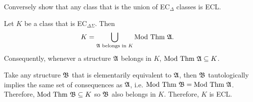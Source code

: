 \begin{problem}[26]
\begin{enumalph}
    \item Conversely show that any class that is the union of EC$_\Delta$ classes
      is ECL.
      \begin{Answer}
        Let $K$ be a class that is EC$_{\Delta \Sigma}$.
        Then
        \[ K = \bigcup_{\mathfrak{A} \text{ belongs in } K} \text{Mod Thm } \mathfrak{A}. \]
        Consequently, whenever a structure $\mathfrak{A}$ belongs in $K$,
        $\text{Mod Thm }\mathfrak{A} \subseteq K$.
        
        \step
        Take any structure $\mathfrak{B}$ that is elementarily equivalent to $\mathfrak{A}$,
        then $\mathfrak{B}$ tautologically implies the same set of consequences as $\mathfrak{A}$,
        i.e. $\text{Mod Thm }\mathfrak{B} = \text{Mod Thm } \mathfrak{A}$.
        Therefore, $\text{Mod Thm }\mathfrak{B} \subseteq K$
        so $\mathfrak{B}$ also belongs in $K$.
        Therefore, $K$ is ECL.
      \end{Answer}
    

  \end{enumalph}
\end{problem}
